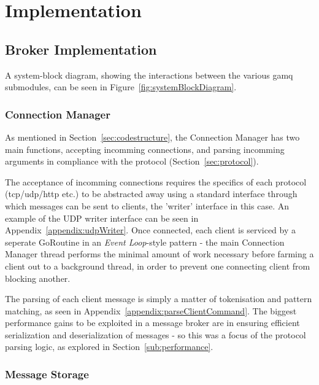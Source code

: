 \chapter{Implementation}
\label{chap:Implementation}

\section{Broker Implementation}
\label{sec:Broker Implementation}

A system-block diagram, showing the interactions between the various gamq
submodules, can be seen in Figure~\ref{fig:systemBlockDiagram}.

\subsection{Connection Manager}
\label{sub:connectionManager}

As mentioned in Section~\ref{sec:codestructure}, the Connection Manager has two
main functions, accepting incomming connections, and parsing incomming arguments
in compliance with the protocol (Section~\ref{sec:protocol}).

The acceptance of incomming connections requires the specifics of each protocol
(\gls{tcp}/\gls{udp}/\gls{http} etc.) to be abstracted away using a standard
interface through which messages can be sent to clients, the 'writer' interface
in this case. An example of the UDP writer interface can be seen in
Appendix~\ref{appendix:udpWriter}. Once connected, each client is serviced by a
seperate GoRoutine in an \emph{Event Loop}-style pattern - the main Connection
Manager thread performs the minimal amount of work necessary before farming a
client out to a background thread, in order to prevent one connecting client
from blocking another.

The parsing of each client message is simply a matter of tokenisation and
pattern matching, as seen in Appendix~\ref{appendix:parseClientCommand}. The
biggest performance gains to be exploited in a message broker are in ensuring
efficient serialization and deserialization of messages - so this was a focus of
the protocol parsing logic, as explored in Section~\ref{sub:performance}.


\subsection{Message Storage}
\label{sub:messageStorage}

